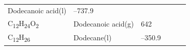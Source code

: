 \documentclass[
  9pt,
]{extbook}
\theoremstyle{definition}
\theoremstyle{definition}
\theoremstyle{definition}
\theoremstyle{remark}
\begin{document}
\begin{longtable}[]{@{}llllll@{}}
\begin{minipage}[t]{0.17\columnwidth}
Dodecanoic acid(l)\strut
\end{minipage} & \begin{minipage}[t]{0.15\columnwidth}\raggedright
--737.9\strut
\end{minipage} & \begin{minipage}[t]{0.15\columnwidth}\raggedright
\strut
\end{minipage} & \begin{minipage}[t]{0.14\columnwidth}\raggedright
\strut
\end{minipage} & \begin{minipage}[t]{0.14\columnwidth}\raggedright
\strut
\end{minipage}\tabularnewline
\begin{minipage}[t]{0.07\columnwidth}\raggedright
C\textsubscript{12}H\textsubscript{24}O\textsubscript{2}\strut
\end{minipage} & \begin{minipage}[t]{0.17\columnwidth}\raggedright
Dodecanoic acid(g)\strut
\end{minipage} & \begin{minipage}[t]{0.15\columnwidth}\raggedright
642\strut
\end{minipage} & \begin{minipage}[t]{0.15\columnwidth}\raggedright
\strut
\end{minipage} & \begin{minipage}[t]{0.14\columnwidth}\raggedright
\strut
\end{minipage} & \begin{minipage}[t]{0.14\columnwidth}\raggedright
\strut
\end{minipage}\tabularnewline
\begin{minipage}[t]{0.07\columnwidth}\raggedright
C\textsubscript{12}H\textsubscript{26}\strut
\end{minipage} & \begin{minipage}[t]{0.17\columnwidth}\raggedright
Dodecane(l)\strut
\end{minipage} & \begin{minipage}[t]{0.15\columnwidth}\raggedright
--350.9\strut
\end{minipage} & \begin{minipage}[t]{0.15\columnwidth}\raggedright
\strut
\end{minipage} & \begin{minipage}[t]{0.14\columnwidth}\raggedright
\strut
\end{minipage} & \begin{minipage}[t]{0.14\columnwidth}\raggedright

\end{minipage}
\end{longtable}
\end{document}
